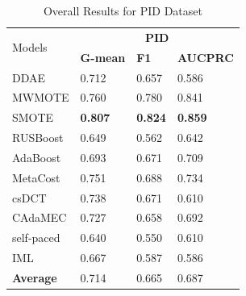 \begin{table}[h]
    \centering
    \renewcommand\arraystretch{0.95} 
    \begin{tabular}{|p{}<{\centering}|p{}<{\centering}|p{}<{\centering}|p{}<{\centering}|}
    \hline
    \multirow{2}{*}{Models} & \multicolumn{3}{c|}{\textbf{PID}}    \\ \cline{2-4} 
                             & \textbf{G-mean} & \textbf{F1} & \textbf{AUCPRC} \\ \hline
    DDAE                     & 0.712	&0.657	&0.586               \\ \hline
    MWMOTE                   &0.760	&0.780	&0.841             \\ \hline
    SMOTE                    & \textbf{0.807}	&\textbf{0.824}	&\textbf{0.859}               \\ \hline
    RUSBoost                 &0.649	&0.562	&0.642             \\ \hline
    AdaBoost                 & 0.693	&0.671	&0.709               \\ \hline
    MetaCost                 & 0.751	&0.688	&0.734             \\ \hline
    csDCT                    &0.738	&0.671	&0.610              \\ \hline
    CAdaMEC                  & 0.727	&0.658	&0.692               \\ \hline
    self-paced               & 0.640	&0.550	&0.610                \\ \hline
    IML                      & 0.667	&0.587	&0.586             \\ \hline\hline
    \textbf{Average}         & 0.714	&0.665	&0.687               \\ \hline
    \end{tabular}
    \vspace{-8pt}
    \caption{Overall Results for PID Dataset}
    \label{tab15}
\end{table}
